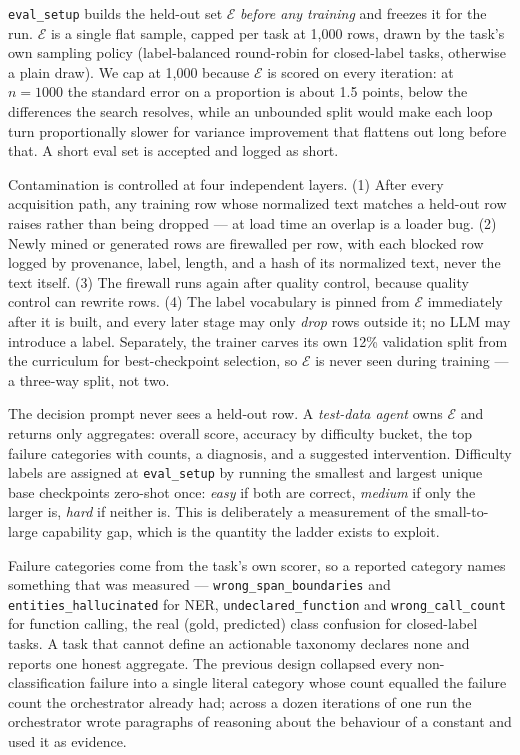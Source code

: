 \documentclass[sigconf,10pt]{acmart}
\begin{document}
\texttt{eval\_setup} builds the held-out set $\mathcal{E}$ \emph{before any training} and
freezes it for the run. $\mathcal{E}$ is a single flat sample, capped per task at 1{,}000
rows, drawn by the task's own sampling policy (label-balanced round-robin for closed-label
tasks, otherwise a plain draw). We cap at 1{,}000 because $\mathcal{E}$ is scored on every
iteration: at $n=1000$ the standard error on a proportion is about 1.5 points, below the
differences the search resolves, while an unbounded split would make each loop turn
proportionally slower for variance improvement that flattens out long before that. A short
eval set is accepted and logged as short.

Contamination is controlled at four independent layers. (1) After every acquisition path, any
training row whose normalized text matches a held-out row raises rather than being dropped ---
at load time an overlap is a loader bug. (2) Newly mined or generated rows are firewalled
per row, with each blocked row logged by provenance, label, length, and a hash of its
normalized text, never the text itself. (3) The firewall runs again after quality control,
because quality control can rewrite rows. (4) The label vocabulary is pinned from
$\mathcal{E}$ immediately after it is built, and every later stage may only \emph{drop} rows
outside it; no LLM may introduce a label. Separately, the trainer carves its own 12\%
validation split from the curriculum for best-checkpoint selection, so $\mathcal{E}$ is never
seen during training --- a three-way split, not two.

The decision prompt never sees a held-out row. A \emph{test-data agent} owns $\mathcal{E}$
and returns only aggregates: overall score, accuracy by difficulty bucket, the top failure
categories with counts, a diagnosis, and a suggested intervention. Difficulty labels are
assigned at \texttt{eval\_setup} by running the smallest and largest unique base checkpoints
zero-shot once: \emph{easy} if both are correct, \emph{medium} if only the larger is,
\emph{hard} if neither is. This is deliberately a measurement of the small-to-large capability
gap, which is the quantity the ladder exists to exploit.

Failure categories come from the task's own scorer, so a reported category names something
that was measured --- \texttt{wrong\_span\_boundaries} and \texttt{entities\_hallucinated}
for NER, \texttt{undeclared\_function} and \texttt{wrong\_call\_count} for function calling,
the real (gold, predicted) class confusion for closed-label tasks. A task that cannot define
an actionable taxonomy declares none and reports one honest aggregate. The previous design
collapsed every non-classification failure into a single literal category whose count equalled
the failure count the orchestrator already had; across a dozen iterations of one run the
orchestrator wrote paragraphs of reasoning about the behaviour of a constant and used it as
evidence.
\end{document}
